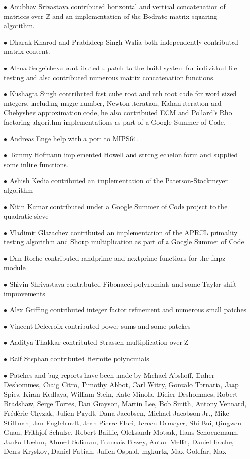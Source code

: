 \documentclass[a4paper,10pt]{book}
\begin{document}
$\bullet$ Anubhav Srivastava contributed horizontal and vertical concatenation
of matrices over $\mathbb{Z}$ and an implementation of the Bodrato matrix
squaring algorithm.

$\bullet$ Dharak Kharod and Prabhdeep Singh Walia both independently
contributed matrix content.

$\bullet$ Alena Sergeicheva contributed a patch to the build system for
individual file testing and also contributed numerous matrix concatenation
functions.

$\bullet$ Kushagra Singh contributed fast cube root and nth root code for word
sized integers, including magic number, Newton iteration, Kahan iteration and
Chebyshev approximation code, he also contributed ECM and Pollard's Rho
factoring algorithm implementations as part of a Google Summer of Code.

$\bullet$ Andreas Enge help with a port to MIPS64.

$\bullet$ Tommy Hofmann implemented Howell and strong echelon form and supplied
some inline functions.

$\bullet$ Ashish Kedia contributed an implementation of the Paterson-Stockmeyer
algorithm

$\bullet$ Nitin Kumar contributed under a Google Summer of Code project to the
quadratic sieve

$\bullet$ Vladimir Glazachev contributed an implementation of the APRCL
primality testing algorithm and Shoup multiplication as part of a Google Summer
of Code

$\bullet$ Dan Roche contributed randprime and nextprime functions for the fmpz
module

$\bullet$ Shivin Shrivastava contributed Fibonacci polynomials and some Taylor
shift improvements

$\bullet$ Alex Griffing contributed integer factor refinement and numerous small
patches

$\bullet$ Vincent Delecroix contributed power sums and some patches

$\bullet$ Aaditya Thakkar contributed Strassen multiplication over Z

$\bullet$ Ralf Stephan contributed Hermite polynomials

$\bullet$ Patches and bug reports have been made by Michael Abshoff,
Didier Deshommes, Craig Citro, Timothy Abbot, Carl Witty, Gonzalo Tornaria,
Jaap Spies, Kiran Kedlaya, William Stein, Kate Minola, Didier Deshommes, Robert
Bradshaw, Serge Torres, Dan Grayson, Martin Lee, Bob Smith, Antony Vennard,
Fr\'{e}d\'{e}ric Chyzak, Julien Puydt, Dana Jacobsen, Michael Jacobson Jr.,
Mike Stillman, Jan Englehardt, Jean-Pierre Flori, Jeroen Demeyer, Shi Bai,
Qingwen Guan, Frithjof Schulze, Robert Baillie, Oleksandr Motsak, Hans
Schoenemann, Janko Boehm, Ahmed Soliman, Francois Bissey, Anton Mellit, Daniel
Roche, Denis Kryskov, Daniel Fabian, Julien Ospald, mgkurtz, Max Goldfar, Max
\end{document}
